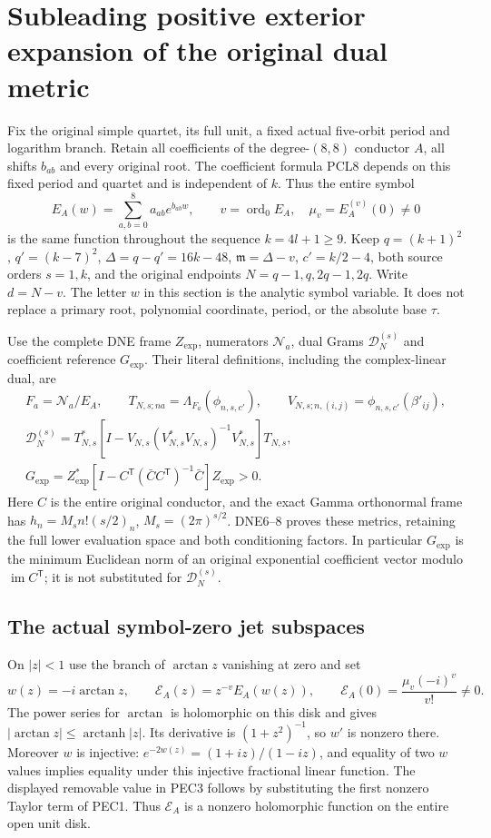 \documentclass[11pt,a4paper]{article}
\begin{document}
\section{Subleading positive exterior expansion of the original dual metric}
\label{sec:PEC}

Fix the original simple quartet, its full unit, a fixed actual five-orbit
period and logarithm branch. Retain all coefficients of the degree-$(8,8)$
conductor $A$, all shifts $b_{ab}$ and every original root. The coefficient
formula PCL8 depends on this fixed period and quartet and is independent
of $k$. Thus the entire symbol
\[
 E_A(w)=\sum_{a,b=0}^8a_{ab}e^{b_{ab}w},\qquad
 v=\operatorname{ord}_0E_A,\quad \mu_v=E_A^{(v)}(0)\ne0
 \tag{PEC1}
\]
is the same function throughout the sequence $k=4l+1\ge9$.
Keep $q=(k+1)^2$, $q'=(k-7)^2$, $\Delta=q-q'=16k-48$,
$\mathfrak m=\Delta-v$, $c'=k/2-4$, both source orders $s=1,k$,
and the original endpoints $N=q-1,q,2q-1,2q$. Write $d=N-v$.
The letter $w$ in this section is the analytic symbol variable.
It does not replace a primary root, polynomial coordinate, period,
or the absolute base $\tau$.

Use the complete DNE frame $Z_{\exp}$, numerators $\mathcal N_a$,
dual Grams $\mathcal D_N^{(s)}$ and coefficient reference $G_{\exp}$.
Their literal definitions, including the complex-linear dual, are
\[
\begin{gathered}
 F_a=\mathcal N_a/E_A,\qquad
 T_{N,s;na}=\Lambda_{F_a}(\phi_{n,s,c'}),\qquad
 V_{N,s;n,(i,j)}=\phi_{n,s,c'}(\beta'_{ij}),\\
 \mathcal D_N^{(s)}=T_{N,s}^*
 [I-V_{N,s}(V_{N,s}^*V_{N,s})^{-1}V_{N,s}^*]T_{N,s},\\
 G_{\exp}=Z_{\exp}^*
 [I-C^{\mathsf T}(\bar C C^{\mathsf T})^{-1}\bar C]Z_{\exp}>0.
\end{gathered}\tag{PEC2}
\]
Here $C$ is the entire original conductor, and the exact Gamma
orthonormal frame has $h_n=M_sn!(s/2)_n$, $M_s=(2\pi)^{s/2}$.
DNE6--8 proves these metrics, retaining the full lower evaluation
space and both conditioning factors. In particular $G_{\exp}$ is
the minimum Euclidean norm of an original exponential coefficient
vector modulo $\operatorname{im}C^{\mathsf T}$; it is not substituted
for $\mathcal D_N^{(s)}$.

\subsection{The actual symbol-zero jet subspaces}
On $|z|<1$ use the branch of $\arctan z$ vanishing at zero and set
\[
 w(z)=-i\arctan z,\qquad
 \mathcal E_A(z)=z^{-v}E_A(w(z)),\qquad
 \mathcal E_A(0)=\frac{\mu_v(-i)^v}{v!}\ne0.
 \tag{PEC3}
\]
The power series for $\arctan$ is holomorphic on this disk and gives
$|\arctan z|\le\operatorname{arctanh}|z|$. Its derivative is
$(1+z^2)^{-1}$, so $w'$ is nonzero there. Moreover $w$ is injective:
$e^{-2w(z)}=(1+iz)/(1-iz)$, and equality of two $w$ values implies
equality under this injective fractional linear function. The displayed
removable value in PEC3 follows by substituting the first nonzero
Taylor term of PEC1. Thus $\mathcal E_A$ is a nonzero holomorphic
function on the entire open unit disk.
\end{document}
